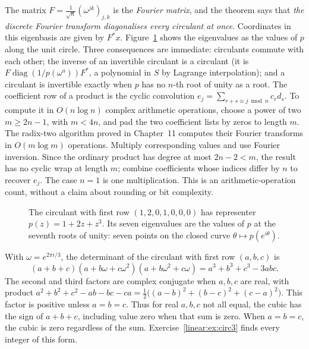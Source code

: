 The matrix $F=\frac1{\sqrt n}(\omega^{jk})_{j,k}$ is the \emph{Fourier matrix}, and the theorem says that \emph{the discrete Fourier
transform diagonalises every circulant at once}. Coordinates in this
eigenbasis are given by $F^*x$. Figure~\ref{linear:fig:circulant} shows the eigenvalues as the values of $p$ along the
unit circle. Three consequences are immediate: circulants commute with each other; the inverse of an invertible circulant is a
circulant (it is $F\operatorname{diag}(1/p(\omega^a))F^*$, a polynomial in $S$ by Lagrange interpolation); and a circulant is
invertible exactly when $p$ has no $n$-th root of unity as a root.
The coefficient row of a product is the cyclic convolution
$e_j=\sum_{r+s\equiv j\bmod n}c_r d_s$. To compute it in $O(n\log n)$
complex arithmetic operations, choose a power of two $m\ge2n-1$, with $m<4n$,
and pad the two coefficient lists by zeros to length $m$. The radix-two
algorithm proved in Chapter~11 computes their Fourier transforms in
$O(m\log m)$ operations. Multiply corresponding values and use Fourier
inversion. Since the ordinary product has degree at most $2n-2<m$, the result
has no cyclic wrap at length $m$; combine coefficients whose indices differ
by $n$ to recover $e_j$. The case $n=1$ is one multiplication. This is an
arithmetic-operation count, without a claim about rounding or bit complexity.

\begin{figure}[ht]
\centering
{}
\caption{The circulant with first row $(1,2,0,1,0,0,0)$ has representer $p(z)=1+2z+z^3$. Its seven eigenvalues are the values
of $p$ at the seventh roots of unity: seven points on the closed curve $\theta\mapsto p(e^{i\theta})$.}
\label{linear:fig:circulant}
\end{figure}

\begin{example}\label{linear:exa:circ3}
With $\omega=e^{2\pi i/3}$, the determinant of the circulant with first row $(a,b,c)$ is
\[
(a+b+c)(a+b\omega+c\omega^2)(a+b\omega^2+c\omega)=a^3+b^3+c^3-3abc.
\]
The second and third factors are complex conjugate when $a,b,c$ are real, with product $a^2+b^2+c^2-ab-bc-ca=\frac12\bigl((a-b)^2+
(b-c)^2+(c-a)^2\bigr)$. This factor is positive unless $a=b=c$.
Thus for real $a,b,c$ not all equal, the cubic has the sign of $a+b+c$,
including value zero when that sum is zero. When $a=b=c$, the cubic is zero
regardless of the sum. Exercise~\ref{linear:ex:circ3} finds every integer
of this form.
\end{example}

